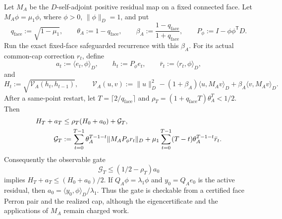 \documentclass[11pt]{article}
\begin{document}
\begin{proposition}
\label{prop:proper-face-perron-split-window}
Let $M_A$ be the $D$-self-adjoint positive residual map on a fixed connected
face.  Let $M_A\phi=\mu_1\phi$, where
$\phi>0$, $\lVert\phi\rVert_D=1$, and put
\begin{equation*}
 q_{\mathrm{face}}:=\sqrt{1-\mu_1},\qquad
 \theta_A:=1-q_{\mathrm{face}},\qquad
 \beta_A:=\frac{1-q_{\mathrm{face}}}{1+q_{\mathrm{face}}},\qquad
 P_\phi:=I-\phi\phi^{\mathsf T}D.
\end{equation*}
Run the exact fixed-face safeguarded recurrence with this $\beta_A$.  For its
actual common-cap correction $r_t$, define
\begin{equation*}
 a_t:=\langle e_t,\phi\rangle_D,\qquad
 h_t:=P_\phi e_t,\qquad
 \bar r_t:=\langle r_t,\phi\rangle_D,
\end{equation*}
and
\begin{equation*}
 H_t:=\sqrt{\mathcal V_A(h_t,h_{t-1})},\qquad
 \mathcal V_A(u,v):=\lVert u\rVert_D^2
 -(1+\beta_A)\langle u,M_Av\rangle_D
 +\beta_A\langle v,M_Av\rangle_D.
\end{equation*}
After a same-point restart, let $T=\lceil2/q_{\mathrm{face}}\rceil$ and
$\rho_T=(1+q_{\mathrm{face}}T)\theta_A^T<1/2$.  Then
\begin{align}
 H_T+a_T
 &\leq\rho_T(H_0+a_0)+\mathcal G_T,\notag\\
 \mathcal G_T
 &:=\sum_{t=0}^{T-1}\theta_A^{T-1-t}
       \lVert M_AP_\phi r_t\rVert_D
   +\mu_1\sum_{t=0}^{T-1}(T-t)\theta_A^{T-1-t}\bar r_t.
 \label{eq:proper-face-perron-split-window}
\end{align}
Consequently the observable gate
\begin{equation}
 \mathcal G_T\leq(1/2-\rho_T)a_0
 \label{eq:proper-face-perron-split-gate}
\end{equation}
implies $H_T+a_T\leq(H_0+a_0)/2$.  If
$Q_A\phi=\lambda_1\phi$ and $y_0=Q_Ae_0$ is the active residual, then
$a_0=\langle y_0,\phi\rangle_D/\lambda_1$.  Thus the gate is checkable from a
certified face Perron pair and the realized cap, although the eigencertificate
and the applications of $M_A$ remain charged work.
\end{proposition}
\end{document}
